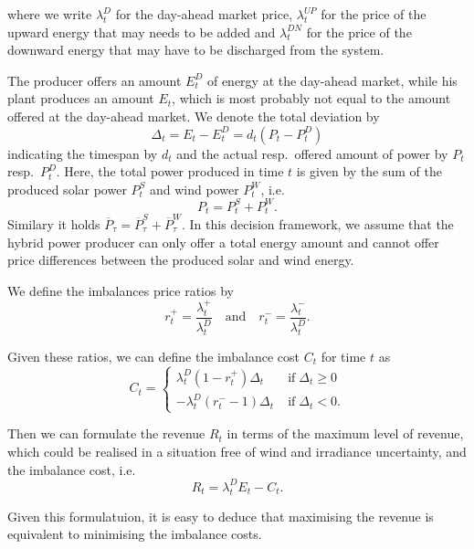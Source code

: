 where we write $\lambda_{t}^{D}$ for the day-ahead market price, $\lambda_{t}^{UP}$ for the price of the upward energy that may needs to be added and $\lambda_{t}^{DN}$ for the price of the downward energy that may have to be discharged from the system.

The producer offers an amount $E_{t}^{D}$ of energy at the day-ahead market, while his plant produces an amount $E_{t}$, which is most probably not equal to the amount offered at the day-ahead market. We denote the total deviation by 
\begin{equation*}
\Delta_{t}=E_{t}-E_{t}^{D}=d_{t}\left(P_{t}-P_{t}^{D}\right)
\end{equation*}
indicating the timespan by $d_{t}$ and the actual resp.\ offered amount of power by $P_{t}$ resp.\ $P_{t}^{D}$.
Here, the total power produced in time $t$ is given by the sum of the produced solar power $P_t^S$ and wind power $P_t^W$, i.e. 
$$ P_t = P_t^S + P_t^W.$$ Similary it holds $\overline{P}_\tau = \overline{P}^S_\tau+ \overline{P}^W_\tau$. In this decision framework, we assume that the hybrid power producer can only offer a total energy amount and cannot offer price differences between the produced solar and wind energy. 


We define the imbalances price ratios by  
\begin{equation*}
r_{t}^{+}= \frac{\lambda_{t}^{+}}{\lambda_{t}^{D}} \quad \mathrm{and} \quad r_{t}^{-}=\frac{\lambda_{t}^{-}}{\lambda_{t}^{D}}.
\end{equation*}

Given these ratios, we can define the imbalance cost $C_t$ for time $t$ as
\begin{equation*}
C_{t}=\begin{cases}
\lambda_{t}^D\left(1-r_{t}^{+}\right)\Delta_{t} &\mathrm{\; if \;} \Delta_{t}\ge 0
\\ -\lambda_{t}^{D}\left(r_{t}^{-}-1\right)\Delta_{t} &\mathrm{\; if \;} \Delta_{t}<0.
\end{cases}
\end{equation*}

Then we can formulate the revenue $R_t$ in terms of the maximum level of revenue, which could be realised in a situation free of wind and irradiance uncertainty, and the imbalance cost, i.e. 
\begin{equation*}
R_{t}=\lambda_{t}^{D}E_{t}-C_{t}.
\end{equation*}

Given this formulatuion, it is easy to deduce that maximising the revenue is equivalent to minimising the imbalance costs.

